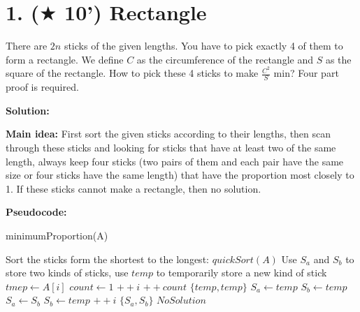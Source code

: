 \documentclass{article}
\begin{document}
\newpage

\section*{1. ($\bigstar$ 10') Rectangle}
There are $2n$ sticks of the given lengths. You have to pick exactly 4 of them to form a rectangle. We define $C$ as the
circumference of the rectangle and $S$ as the square of the rectangle. How to pick these 4 sticks to make $\frac{C^2}{S}$ min?
Four part proof is required. 
{\color{blue}
\par\textbf{Solution: }
\par\textbf{Main idea: }First sort the given sticks according to their lengths, then scan through these sticks and looking for sticks that have at least two of the same length, always keep four sticks (two pairs of them and each pair have the same size or four sticks have the same length) that have the proportion most closely to 1. If these sticks cannot make a rectangle, then no solution.\\

\par\textbf{Pseudocode: }
\begin{algorithm}
	\caption{minimumProportion(A)}
	\label{alg2}
	\color{blue}
	\begin{algorithmic}
		\STATE Sort the sticks form the shortest to the longest: $quickSort(A)$
		\STATE Use $S_a$ and $S_b$ to store two kinds of sticks, use $temp$ to temporarily store a new kind of stick
				\STATE $tmep \gets A[i]$
				\STATE $count \gets 1$
					\STATE $++i$
					\STATE $++count$
						\RETURN $\{temp, temp\}$
					\ENDIF
				\ENDWHILE
					\STATE $S_a \gets temp$
					\STATE $S_b \gets temp$
					\STATE $S_a \gets S_b$
					\STATE $S_b \gets temp$
				\ENDIF
			\ENDIF
			\STATE $++i$
		\ENDWHILE
			\RETURN $\{S_a, S_b\}$
		\ELSE
			\RETURN $NoSolution$
		\ENDIF
	\end{algorithmic}
\end{algorithm}

}
\end{document}
